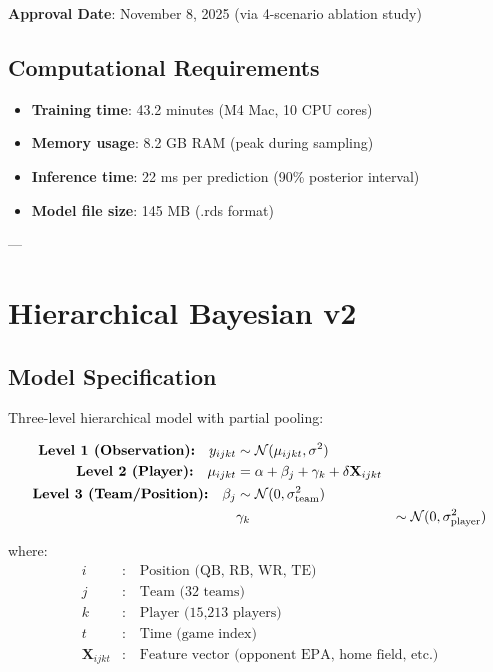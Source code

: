 \textbf{Approval Date}: November 8, 2025 (via 4-scenario ablation study)

\subsection{Computational Requirements}

\begin{itemize}
\item \textbf{Training time}: 43.2 minutes (M4 Mac, 10 CPU cores)
\item \textbf{Memory usage}: 8.2 GB RAM (peak during sampling)
\item \textbf{Inference time}: 22 ms per prediction (90\% posterior interval)
\item \textbf{Model file size}: 145 MB (.rds format)
\end{itemize}

---

\section{Hierarchical Bayesian v2}
\label{sec:hierarchical-v2-spec}

\subsection{Model Specification}

Three-level hierarchical model with partial pooling:

\begin{align}
\text{\textbf{Level 1 (Observation):}} \quad y_{ijkt} &\sim \mathcal{N}(\mu_{ijkt}, \sigma^2) \\
\text{\textbf{Level 2 (Player):}} \quad \mu_{ijkt} &= \alpha + \beta_j + \gamma_k + \delta \mathbf{X}_{ijkt} \\
\text{\textbf{Level 3 (Team/Position):}} \quad \beta_j &\sim \mathcal{N}(0, \sigma^2_{\text{team}}) \\
                                             & \gamma_k &\sim \mathcal{N}(0, \sigma^2_{\text{player}})
\label{eq:hierarchical-spec}
\end{align}

where:
\begin{align}
i &: \quad \text{Position (QB, RB, WR, TE)} \\
j &: \quad \text{Team (32 teams)} \\
k &: \quad \text{Player (15,213 players)} \\
t &: \quad \text{Time (game index)} \\
\mathbf{X}_{ijkt} &: \quad \text{Feature vector (opponent EPA, home field, etc.)}
\end{align}

